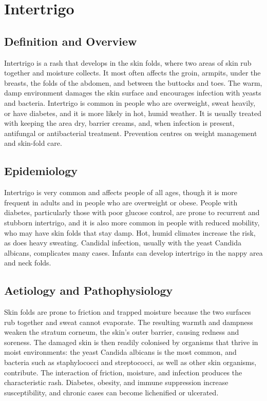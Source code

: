 \chapter{Intertrigo}

\section*{Definition and Overview}
Intertrigo is a rash that develops in the skin folds, where two areas of skin rub together and moisture collects. It most often affects the groin, armpits, under the breasts, the folds of the abdomen, and between the buttocks and toes. The warm, damp environment damages the skin surface and encourages infection with yeasts and bacteria. Intertrigo is common in people who are overweight, sweat heavily, or have diabetes, and it is more likely in hot, humid weather. It is usually treated with keeping the area dry, barrier creams, and, when infection is present, antifungal or antibacterial treatment. Prevention centres on weight management and skin-fold care.

\section*{Epidemiology}
Intertrigo is very common and affects people of all ages, though it is more frequent in adults and in people who are overweight or obese. People with diabetes, particularly those with poor glucose control, are prone to recurrent and stubborn intertrigo, and it is also more common in people with reduced mobility, who may have skin folds that stay damp. Hot, humid climates increase the risk, as does heavy sweating. Candidal infection, usually with the yeast Candida albicans, complicates many cases. Infants can develop intertrigo in the nappy area and neck folds.

\section*{Aetiology and Pathophysiology}
Skin folds are prone to friction and trapped moisture because the two surfaces rub together and sweat cannot evaporate. The resulting warmth and dampness weaken the stratum corneum, the skin's outer barrier, causing redness and soreness. The damaged skin is then readily colonised by organisms that thrive in moist environments: the yeast Candida albicans is the most common, and bacteria such as staphylococci and streptococci, as well as other skin organisms, contribute. The interaction of friction, moisture, and infection produces the characteristic rash. Diabetes, obesity, and immune suppression increase susceptibility, and chronic cases can become lichenified or ulcerated.

